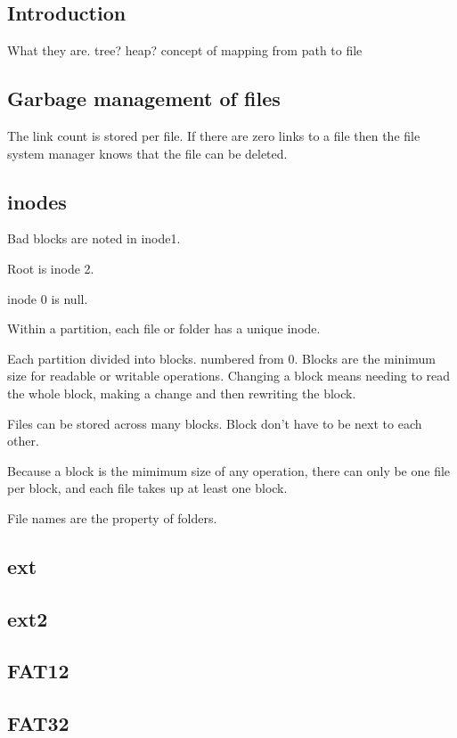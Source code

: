 
\subsection{Introduction}

What they are. tree? heap? concept of mapping from path to file

\subsection{Garbage management of files}

The link count is stored per file. If there are zero links to a file then the file system manager knows that the file can be deleted.

\subsection{inodes}

Bad blocks are noted in inode1.

Root is inode 2.

inode 0 is null.


Within a partition, each file or folder has a unique inode.

Each partition divided into blocks. numbered from 0. Blocks are the minimum size for readable or writable operations. Changing a block means needing to read the whole block, making a change and then rewriting the block.

Files can be stored across many blocks. Block don't have to be next to each other.

Because a block is the mimimum size of any operation, there can only be one file per block, and each file takes up at least one block.

File names are the property of folders.


\subsection{ext}

\subsection{ext2}

\subsection{FAT12}

\subsection{FAT32}

